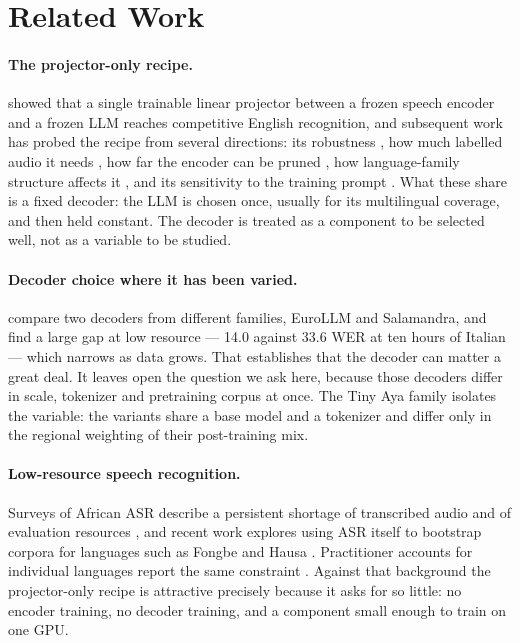 \documentclass[11pt]{article}
\begin{document}
\section{Related Work}
\label{sec:related}

\paragraph{The projector-only recipe.}
\citet{maEmbarrassinglySimpleApproach2024} showed that a single trainable linear projector
between a frozen speech encoder and a frozen LLM reaches competitive English recognition, and
subsequent work has probed the recipe from several directions: its robustness
\citep{kumarPerformanceEvaluationSLAMASR2025}, how much labelled audio it needs
\citep{fongSpeechLLMsLowResource2025}, how far the encoder can be pruned
\citep{kolluriRoleEncoderDepth2026}, how language-family structure affects it
\citep{zhangLanguageFamilyMatters2026}, and its sensitivity to the training prompt
\citep{burdissoReducingPromptSensitivity2026}. What these share is a fixed decoder: the LLM is
chosen once, usually for its multilingual coverage, and then held constant. The decoder is
treated as a component to be selected well, not as a variable to be studied.

\paragraph{Decoder choice where it has been varied.}
\citet{fongSpeechLLMsLowResource2025} compare two decoders from different families, EuroLLM and
Salamandra, and find a large gap at low resource --- 14.0 against 33.6 WER at ten hours of
Italian --- which narrows as data grows. That establishes that the decoder can matter a great
deal. It leaves open the question we ask here, because those decoders differ in scale, tokenizer
and pretraining corpus at once. The Tiny Aya family isolates the variable: the variants share a
base model and a tokenizer and differ only in the regional weighting of their post-training mix.

\paragraph{Low-resource speech recognition.}
Surveys of African ASR describe a persistent shortage of transcribed audio and of evaluation
resources \citep{imamAutomaticSpeechRecognitionAfrican2025, imamAutomaticSpeechRecognition}, and
recent work explores using ASR itself to bootstrap corpora for languages such as Fongbe and
Hausa \citep{adjoviSpeechTextCorpora2026}. Practitioner accounts for individual languages report
the same constraint \citep{klejchPractitionersGuideBuilding2025}. Against that background the
projector-only recipe is attractive precisely because it asks for so little: no encoder training,
no decoder training, and a component small enough to train on one GPU.
\end{document}
